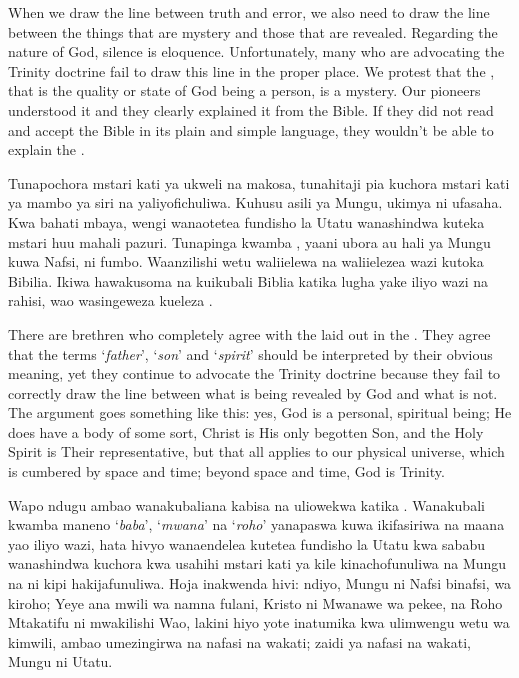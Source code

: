 When we draw the line between truth and error, we also need to draw the line between the things that are mystery and those that are revealed. Regarding the nature of God, silence is eloquence. Unfortunately, many who are advocating the Trinity doctrine fail to draw this line in the proper place. We protest that the , that is the quality or state of God being a person, is a mystery. Our pioneers understood it and they clearly explained it from the Bible. If they did not read and accept the Bible in its plain and simple language, they wouldn’t be able to explain the .


Tunapochora mstari kati ya ukweli na makosa, tunahitaji pia kuchora mstari kati ya mambo ya siri na yaliyofichuliwa. Kuhusu asili ya Mungu, ukimya ni ufasaha. Kwa bahati mbaya, wengi wanaotetea fundisho la Utatu wanashindwa kuteka mstari huu mahali pazuri. Tunapinga kwamba , yaani ubora au hali ya Mungu kuwa Nafsi, ni fumbo. Waanzilishi wetu waliielewa na waliielezea wazi kutoka Bibilia. Ikiwa hawakusoma na kuikubali Biblia katika lugha yake iliyo wazi na rahisi, wao wasingeweza kueleza .


There are brethren who completely agree with the  laid out in the . They agree that the terms ‘\textit{father}’, ‘\textit{son}’ and ‘\textit{spirit}’ should be interpreted by their obvious meaning, yet they continue to advocate the Trinity doctrine because they fail to correctly draw the line between what is being revealed by God and what is not. The argument goes something like this: yes, God is a personal, spiritual being; He does have a body of some sort, Christ is His only begotten Son, and the Holy Spirit is Their representative, but that all applies to our physical universe, which is cumbered by space and time; beyond space and time, God is Trinity.


Wapo ndugu ambao wanakubaliana kabisa na  uliowekwa katika . Wanakubali kwamba maneno ‘\textit{baba}’, ‘\textit{mwana}’ na ‘\textit{roho}’ yanapaswa kuwa ikifasiriwa na maana yao iliyo wazi, hata hivyo wanaendelea kutetea fundisho la Utatu kwa sababu wanashindwa kuchora kwa usahihi mstari kati ya kile kinachofunuliwa na Mungu na ni kipi hakijafunuliwa. Hoja inakwenda hivi: ndiyo, Mungu ni Nafsi binafsi, wa kiroho; Yeye ana mwili wa namna fulani, Kristo ni Mwanawe wa pekee, na Roho Mtakatifu ni mwakilishi Wao, lakini hiyo yote inatumika kwa ulimwengu wetu wa kimwili, ambao umezingirwa na nafasi na wakati; zaidi ya nafasi na wakati, Mungu ni Utatu.


